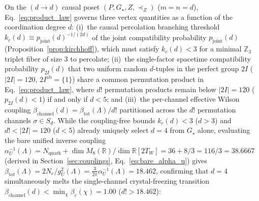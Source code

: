 \documentclass[11pt,a4paper]{article}
\theoremstyle{definition}
\theoremstyle{remark}
\newcommand{\R}{\mathbb{R}}
\newcommand{\Z}{\mathbb{Z}}
\newcommand{\Gstar}{G_\star}
\begin{document}
On the $(d \to d)$ causal poset $(P, \Gstar, Z, \prec_Z)$ ($m = n = d$), Eq.~\eqref{eq:product_law} governs three vertex quantities as a function of the coordination degree $d$: (i)~the causal percolation branching threshold $k_c(d) \equiv p_{\mathrm{joint}}(d)^{-1/(2d)}$ of the joint compatibility probability $p_{\mathrm{joint}}(d)$ (Proposition~\ref{prop:kirchhoff}), which must satisfy $k_c(d) < 3$ for a minimal $\Z_3$ triplet fiber of size $3$ to percolate; (ii)~the single-factor spacetime compatibility probability $p_{2I}(d)$ that two uniform random $d$-tuples in the perfect group $2I$ ($|2I| = 120$, $2I^{\mathrm{ab}} = \{1\}$) share a common permutation product in Eq.~\eqref{eq:product_law}, where $d!$ permutation products remain below $|2I| = 120$ ($p_{2I}(d) < 1$) if and only if $d < 5$; and (iii)~the per-channel effective Wilson coupling $\beta_{\mathrm{channel}}(d) = \beta_{\mathrm{tot}}(\Lambda) / d!$ partitioned across the $d!$ permutation channels $\sigma \in S_d$. While the coupling-free bounds $k_c(d) < 3$ ($d > 3$) and $d! < |2I| = 120$ ($d < 5$) already uniquely select $d = 4$ from $\Gstar$ alone, evaluating the bare unified inverse coupling $\alpha_U^{-1}(\Lambda) = N_{\mathrm{quark}} + \dim M_8(\R)/\dim\R[2T_W] = 36 + 8/3 = 116/3 = 38.6667$ (derived in Section~\ref{sec:couplings}, Eq.~\eqref{eq:bare_alpha_u}) gives $\beta_{\mathrm{tot}}(\Lambda) = 2N_c / g_U^2(\Lambda) = \frac{3}{2\pi}\alpha_U^{-1}(\Lambda) = 18.462$, confirming that $d = 4$ simultaneously melts the single-channel crystal-freezing transition $\beta_{\mathrm{channel}}(d) < \min_\chi \beta_c(\chi) = 1.00$ ($d! > 18.462$):
\end{document}
